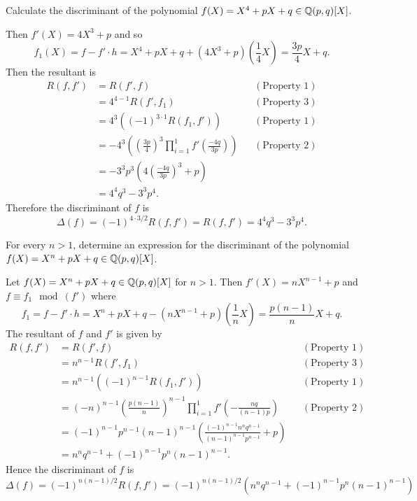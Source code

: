     \begin{ex}{14.15}
        Calculate the discriminant of the polynomial $f(X)=X^4+pX+q\in\mathbb{Q}(p,q)[X]$.
    \end{ex}
    \begin{sol}
        Then $f'(X)=4X^3+p$ and so 
        $$f_1(X)=f-f'\cdot h = X^4+pX+q+(4X^3+p)(\frac14 X) = \frac{3p}{4}X+q.$$
        Then the resultant is
        \begin{align*}
            R(f,f')&=R(f',f)&&(\text{Property } 1)\\
            &=4^{4-1}R(f', f_1)&&(\text{Property } 3)\\
            &=4^3\left((-1)^{3\cdot 1}R(f_1,f')\right)&&(\text{Property } 1)\\
            &=-4^3\left(\left(\frac{3p}{4}\right)^3\prod_{i=1}^{1}f'\left(\frac{-4q}{3p}\right)\right)&&(\text{Property } 2)\\
            &=-3^3p^3\left(4\left(\frac{-4q}{3p}\right)^3+p\right)\\
            &=4^4q^3-3^3p^4.
        \end{align*}
        Therefore the discriminant of $f$ is
        $$
            \Delta(f) = (-1)^{4\cdot 3/2}R(f,f') = R(f, f') = 4^4q^3-3^3p^4.
        $$
    \end{sol}

    \begin{ex}{14.16}
        For every $n>1$, determine an expression for the discriminant of the polynomial $f(X) = X^n+pX+q\in\mathbb{Q}(p,q)[X]$.
    \end{ex}
    \begin{sol}
        Let $f(X)=X^n+pX+q\in\mathbb{Q}(p,q)[X]$ for $n>1$. 
        Then $f'(X)=nX^{n-1}+p$ and $f\equiv f_1\mod(f')$ where
        $$f_1 = f-f'\cdot h = X^n+pX+q-\left(nX^{n-1}+p\right)\left(\frac1n X\right)=\frac{p(n-1)}{n}X+q.$$
        The resultant of $f$ and $f'$ is given by
        \begin{align*}
            R(f,f') &= R(f', f)&&(\text{Property } 1)\\
            &=n^{n-1}R(f', f_1)&&(\text{Property } 3)\\
            &=n^{n-1}\left((-1)^{n-1}R(f_1, f')\right)&&(\text{Property } 1)\\
            &=(-n)^{n-1}\left(\frac{p(n-1)}{n}\right)^{n-1}\prod_{i=1}^1 f'\left(-\frac{nq}{(n-1)p}\right)&&(\text{Property } 2)\\
            &=(-1)^{n-1}p^{n-1}(n-1)^{n-1}\left(\frac{(-1)^{n-1}n^nq^{n-1}}{(n-1)^{n-1}p^{n-1}}+p\right)\\
            &=n^nq^{n-1}+(-1)^{n-1}p^n(n-1)^{n-1}.
        \end{align*}
        Hence the discriminant of $f$ is
        $$
            \Delta(f)=(-1)^{n(n-1)/2}R(f,f')=(-1)^{n(n-1)/2}\left(n^nq^{n-1}+(-1)^{n-1}p^n(n-1)^{n-1}\right)
        $$
    \end{sol}

